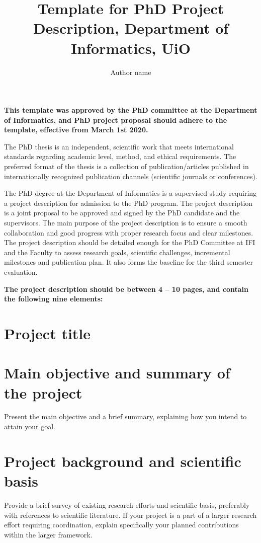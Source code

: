 \documentclass{scrarticle}
\title{Template for PhD Project Description, Department of Informatics, UiO}
\author{Author name}
\begin{document}
\maketitle

\textbf{This template was approved by the PhD committee at the Department of Informatics, and PhD project proposal should adhere to the template, effective from March 1st 2020.}

The PhD thesis is an independent, scientific work that meets international standards regarding academic level, method, and ethical requirements. The preferred format of the thesis is a collection of publication/articles published in internationally recognized publication channels (scientific journals or conferences).

The PhD degree at the Department of Informatics is a supervised study requiring a project description for admission to the PhD program. The project description is a joint proposal to be approved and signed by the PhD candidate and the supervisors. The main purpose of the project description is to ensure a smooth collaboration and good progress with proper research focus and clear milestones. The project description should be detailed enough for the PhD Committee at IFI and the Faculty to assess research goals, scientific challenges, incremental milestones and publication plan. It also forms the baseline for the third semester evaluation.

\textbf{The project description should be between 4 – 10 pages, and contain the following nine elements:}

\section{Project title}

\section{Main objective and summary of the project}

Present the main objective and a brief summary, explaining how you intend to attain your goal.

\section{Project background and scientific basis}

Provide a brief survey of existing research efforts and scientific basis, preferably with references to scientific literature. If your project is a part of a larger research effort requiring coordination, explain specifically your planned contributions within the larger framework.
\end{document}
